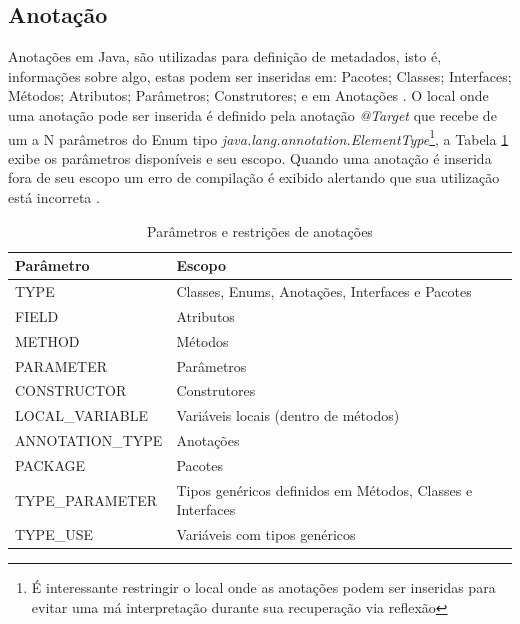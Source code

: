 \subsection{Anotação}

\par Anotações em Java, são utilizadas para definição de metadados, isto é, informações sobre algo, estas podem ser inseridas em: Pacotes; Classes; Interfaces; Métodos; Atributos; Parâmetros; Construtores; e em Anotações \cite{jcp2005annotation269}. O local onde uma anotação pode ser inserida é definido pela anotação \textit{@Target} que recebe de um a N parâmetros do Enum tipo \textit{java.lang.annotation.ElementType}\footnote{É interessante restringir o local onde as anotações podem ser inseridas para evitar uma má interpretação durante sua recuperação via reflexão}, a Tabela \ref{tab:targets} exibe os parâmetros disponíveis e seu escopo. Quando uma anotação é inserida fora de seu escopo um erro de compilação é exibido alertando que sua utilização está incorreta .

\begin{table}[H]
    \centering
    \caption{Parâmetros e restrições de anotações}
    \begin{tabular}{|l|l|}
        \hline
        Parâmetro & Escopo \\ \hline
        TYPE & Classes, Enums, Anotações, Interfaces e  Pacotes \\ \hline
        FIELD & Atributos \\ \hline
        METHOD & Métodos \\ \hline
        PARAMETER & Parâmetros \\ \hline
        CONSTRUCTOR & Construtores \\ \hline
        LOCAL\_VARIABLE & Variáveis locais (dentro de métodos) \\ \hline ANNOTATION\_TYPE & Anotações \\ \hline
        PACKAGE & Pacotes \\ \hline
        TYPE\_PARAMETER  & Tipos genéricos definidos em Métodos, Classes e Interfaces \\ \hline
        TYPE\_USE & Variáveis com tipos genéricos \\ \hline
\end{tabular}
    \label{tab:targets}
\end{table}

